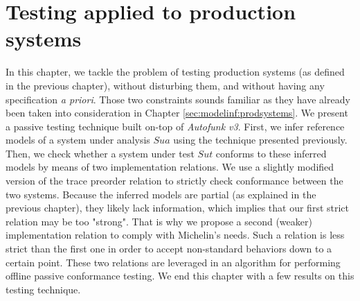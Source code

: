 %
\chapter{Testing applied to production systems}
\label{sec:testing}

In this chapter, we tackle the problem of testing production
systems (as defined in the previous chapter), without disturbing
them, and without having any specification \emph{a priori}. Those
two constraints sounds familiar as they have already been taken
into consideration in Chapter \ref{sec:modelinf:prodsystems}. We
present a passive testing technique built on-top of
\emph{Autofunk v3}. First, we infer reference models of a system
under analysis $\mathit{Sua}$ using the technique presented
previously.  Then, we check whether a system under test
$\mathit{Sut}$ conforms to these inferred models by means of two
implementation relations. We use a slightly modified version of
the trace preorder relation to strictly check conformance between
the two systems. Because the inferred models are partial (as
explained in the previous chapter), they likely lack information,
which implies that our first strict relation may be too "strong".
That is why we propose a second (weaker) implementation relation
to comply with Michelin's needs.  Such a relation is less strict
than the first one in order to accept non-standard behaviors down
to a certain point. These two relations are leveraged in an
algorithm for performing offline passive conformance testing.  We
end this chapter with a few results on this testing technique.\\

\minitoc

\pagebreak






\cleardoublepage
\blankpage
